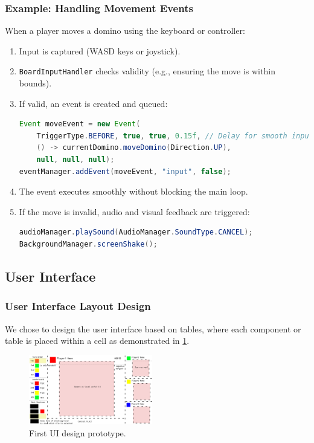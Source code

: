 \documentclass[conference]{IEEEtran}
\begin{document}
\subsubsection{Example: Handling Movement Events}
When a player moves a domino using the keyboard or controller:
\begin{enumerate}
    \item Input is captured (WASD keys or joystick).
    \item \texttt{BoardInputHandler} checks validity (e.g., ensuring the move is within bounds).
    \item If valid, an event is created and queued:
          \begin{lstlisting}[language=Java]
Event moveEvent = new Event(
    TriggerType.BEFORE, true, true, 0.15f, // Delay for smooth input
    () -> currentDomino.moveDomino(Direction.UP),
    null, null, null);
eventManager.addEvent(moveEvent, "input", false);
    \end{lstlisting}
    \item The event executes smoothly without blocking the main loop.
    \item If the move is invalid, audio and visual feedback are triggered:
          \begin{lstlisting}[language=Java]
audioManager.playSound(AudioManager.SoundType.CANCEL);
BackgroundManager.screenShake();
    \end{lstlisting}
\end{enumerate}

\subsection{User Interface}

\subsubsection{User Interface Layout Design}

We chose to design the user interface based on tables, where each component or table is placed within a cell as demonstrated in \ref{fig:ui-proto}.

\begin{figure}[htbp]
    \centerline{\includegraphics[width=0.48\textwidth]{assets/ui-prototype.png}}
    \caption{First UI design prototype.}\label{fig:ui-proto}
\end{figure}
\end{document}
